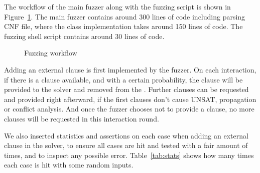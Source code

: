 The workflow of the main fuzzer along with the fuzzing script is shown in Figure~\ref{fig:fuzzer}. The main fuzzer contains around 300 lines of  code including parsing CNF file, where the  class implementation takes around 150 lines of code. The fuzzing shell script contains around 30 lines of code.

\begin{figure}[!htbp]
  \centering
  
  \caption{Fuzzing workflow}
  \label{fig:fuzzer}
\end{figure}

Adding an external clause is first implemented by the fuzzer. On each interaction, if there is a clause available, and with a certain probability, the clause will be provided to the solver and removed from the . Further clauses can be requested and provided right afterward, if the first clauses don't cause UNSAT, propagation or conflict analysis. And once the fuzzer chooses not to provide a clause, no more clauses will be requested in this interaction round.

We also inserted statistics and assertions on each case when adding an external clause in the solver, to ensure all cases are hit and tested with a fair amount of times, and to inspect any possible error. Table~\ref{tab:stats} shows how many times each case is hit with some random inputs.

